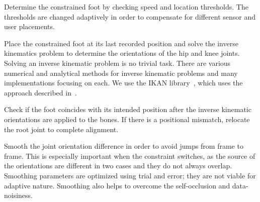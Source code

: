 \documentclass[number,preprint,review,12pt]{elsarticle}
\begin{document}
 
\begin{enumerate}
{\color{red}
\item Determine the constrained foot by checking speed and location thresholds. The thresholds are changed adaptively in order to compensate for different sensor and user placements.
}

{\color{red} 
\item Place the constrained foot at its last recorded position and solve the inverse kinematics problem to determine the orientations of the hip and knee joints. Solving an inverse kinematic problem is no trivial task. There are various numerical and analytical methods for inverse kinematic problems and many implementations focusing on each. We use the IKAN library~\cite{IKAN2013}, which uses the approach described in~\cite{Tolani2000}.  
}

{\color{red} 
\item Check if the foot coincides with its intended position after the inverse kinematic orientations are applied to the bones. If there is a positional mismatch, relocate the root joint to complete alignment.
}

{\color{red} 
\item Smooth the joint orientation difference in order to avoid jumps from frame to frame. This is especially important when the constraint switches, as the source of the orientations are different in two cases and they do not always overlap. Smoothing parameters are optimized using trial and error; they are not viable for adaptive nature. Smoothing also helps to overcome the self-occlusion and data-noisiness.
}
\end{enumerate}
\end{document}
